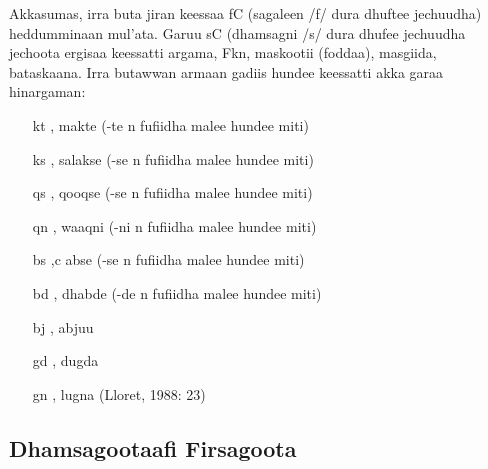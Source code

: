 \documentclass[11pt,b5paper]{book}
\begin{document}
Akkasumas, irra buta jiran keessaa fC (sagaleen /f/ dura dhuftee jechuudha) heddumminaan mul’ata. Garuu sC (dhamsagni /s/ dura dhufee jechuudha jechoota ergisaa
keessatti argama, Fkn, maskootii (foddaa), masgiida, bataskaana. Irra butawwan armaan gadiis hundee keessatti akka garaa hinargaman:
\begin{itemize}
        \item[kt], makte (-te n fufiidha malee hundee miti)
        \item[ks], salakse (-se n fufiidha malee hundee miti)
        \item[qs], qooqse (-se n fufiidha malee hundee miti)
        \item[qn], waaqni (-ni n fufiidha malee hundee miti)
        \item[bs],c abse (-se n fufiidha malee hundee miti)
        \item[bd], dhabde (-de n fufiidha malee hundee miti)
        \item[bj], abjuu
        \item[gd], dugda
        \item[gn], lugna (Lloret, 1988: 23)
\end{itemize}

\subsection{Dhamsagootaafi Firsagoota}
\end{document}
